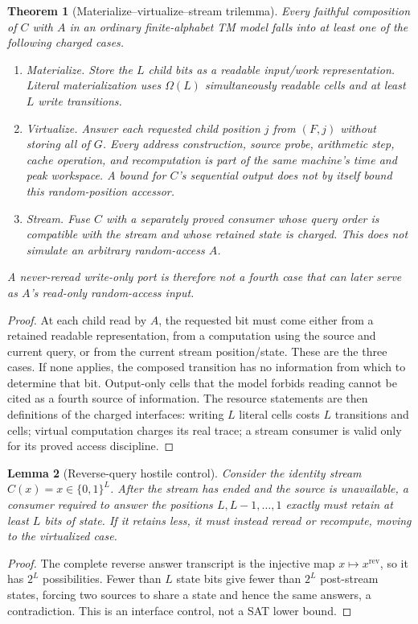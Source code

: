 \documentclass[11pt]{article}
\newtheorem{theorem}{Theorem}
\newtheorem{lemma}[theorem]{Lemma}
\begin{document}
\begin{theorem}[Materialize--virtualize--stream trilemma]\label{th:tri}
Every faithful composition of $C$ with $A$ in an ordinary finite-alphabet TM
model falls into at least one of the following charged cases.
\begin{enumerate}
\item \emph{Materialize.}  Store the $L$ child bits as a readable input/work
representation.  Literal materialization uses $\Omega(L)$ simultaneously
readable cells and at least $L$ write transitions.
\item \emph{Virtualize.}  Answer each requested child position $j$ from
$(F,j)$ without storing all of $G$.  Every address construction, source
probe, arithmetic step, cache operation, and recomputation is part of the
same machine's time and peak workspace.  A bound for $C$'s sequential output
does not by itself bound this random-position accessor.
\item \emph{Stream.}  Fuse $C$ with a separately proved consumer whose query
order is compatible with the stream and whose retained state is charged.
This does not simulate an arbitrary random-access $A$.
\end{enumerate}
A never-reread write-only port is therefore not a fourth case that can later
serve as $A$'s read-only random-access input.
\end{theorem}
\begin{proof}
At each child read by $A$, the requested bit must come either from a retained
readable representation, from a computation using the source and current
query, or from the current stream position/state.  These are the three cases.
If none applies, the composed transition has no information from which to
determine that bit.  Output-only cells that the model forbids reading cannot
be cited as a fourth source of information.  The resource statements are
then definitions of the charged interfaces: writing $L$ literal cells costs
$L$ transitions and cells; virtual computation charges its real trace; a
stream consumer is valid only for its proved access discipline.
\end{proof}

\begin{lemma}[Reverse-query hostile control]\label{lem:reverse}
Consider the identity stream $C(x)=x\in\{0,1\}^L$.  After the stream has
ended and the source is unavailable, a consumer required to answer the
positions $L,L-1,\ldots,1$ exactly must retain at least $L$ bits of state.
If it retains less, it must instead reread or recompute, moving to the
virtualized case.
\end{lemma}
\begin{proof}
The complete reverse answer transcript is the injective map $x\mapsto
x^{\mathrm{rev}}$, so it has $2^L$ possibilities.  Fewer than $L$ state bits
give fewer than $2^L$ post-stream states, forcing two sources to share a state
and hence the same answers, a contradiction.  This is an interface control,
not a SAT lower bound.
\end{proof}
\end{document}

